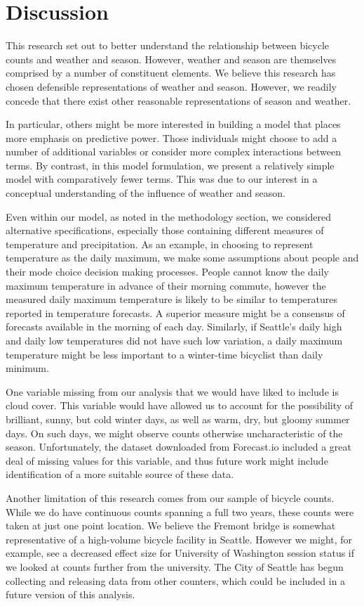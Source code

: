 \documentclass[12pt,letterpaper,article]{memoir}
\begin{document}
\FloatBarrier
\chapter*{Discussion}
This research set out to better understand the relationship between
bicycle counts and weather and season. However, weather and season are
themselves comprised by a number of constituent elements. We believe
this research has chosen defensible representations of weather and
season. However, we readily concede that there exist other reasonable
representations of season and weather.

In particular, others might be more interested in building a model
that places more emphasis on predictive power. Those individuals might
choose to add a number of additional variables or consider more
complex interactions between terms. By contrast, in this model
formulation, we present a relatively simple model with comparatively
fewer terms. This was due to our interest in a conceptual
understanding of the influence of weather and season.

Even within our model, as noted in the methodology section, we
considered alternative specifications, especially those containing
different measures of temperature and precipitation. As an example, in
choosing to represent temperature as the daily maximum, we make some
assumptions about people and their mode choice decision making
processes. People cannot know the daily maximum temperature in advance
of their morning commute, however the measured daily maximum
temperature is likely to be similar to temperatures reported in
temperature forecasts. A superior measure might be a consensus of
forecasts available in the morning of each day. Similarly, if
Seattle's daily high and daily low temperatures did not have such low
variation, a daily maximum temperature might be less important to a
winter-time bicyclist than daily minimum.

One variable missing from our analysis that we would have liked to
include is cloud cover. This variable would have allowed us to account
for the possibility of brilliant, sunny, but cold winter days, as well
as warm, dry, but gloomy summer days. On such days, we might observe
counts otherwise uncharacteristic of the season. Unfortunately, the
dataset downloaded from Forecast.io included a great deal of missing
values for this variable, and thus future work might include
identification of a more suitable source of these data.

Another limitation of this research comes from our sample of bicycle
counts. While we do have continuous counts spanning a full two years,
these counts were taken at just one point location. We believe the
Fremont bridge is somewhat representative of a high-volume bicycle
facility in Seattle. However we might, for example, see a decreased
effect size for University of Washington session status if we looked
at counts further from the university. The City of Seattle has begun
collecting and releasing data from other counters, which could be
included in a future version of this analysis.
\end{document}
